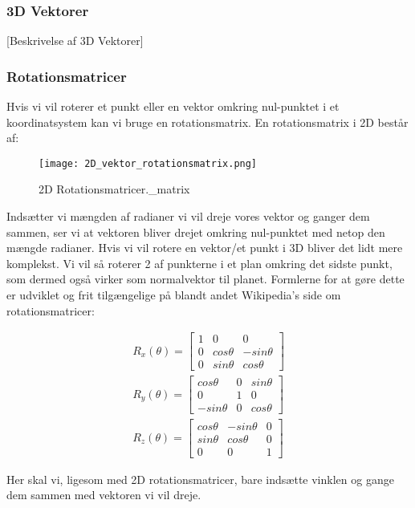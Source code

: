 \subsubsection{3D Vektorer}

[Beskrivelse af 3D Vektorer]


\subsubsection{Rotationsmatricer}
Hvis vi vil roterer et punkt eller en vektor omkring nul-punktet i et koordinatsystem kan vi bruge en rotationsmatrix\cite{rotationsmatricer}. En rotationsmatrix i 2D består af:
\begin{figure}[H]
  \centering
  \texttt{[image: 2D\_vektor\_rotationsmatrix.png]}
  \caption{2D Rotationsmatricer.\_matrix}
\end{figure}



Indsætter vi mængden af radianer vi vil dreje vores vektor og ganger dem sammen, ser vi at vektoren bliver drejet omkring nul-punktet med netop den mængde radianer. 
Hvis vi vil rotere en vektor/et punkt i 3D bliver det lidt mere komplekst. Vi vil så roterer 2 af punkterne i et plan omkring det sidste punkt, som dermed også virker som normalvektor til planet. Formlerne for at gøre dette er udviklet og frit tilgængelige på blandt andet Wikipedia's side om rotationsmatricer:

\begin{align}\label{eu_eqn}
R_x(\theta) = 
\begin{bmatrix}
1 & 0 & 0\\ 
0 & cos \theta & - sin \theta\\ 
0 & sin \theta & cos \theta
\end{bmatrix}\\
R_y(\theta) = 
\begin{bmatrix}
cos \theta  & 0 & sin \theta\\ 
0           & 1 & 0\\ 
-sin \theta & 0 & cos \theta
\end{bmatrix}\\
R_z(\theta) = 
\begin{bmatrix}
cos \theta & - sin \theta & 0\\ 
sin \theta & cos \theta & 0\\
0 & 0 & 1
\end{bmatrix}
\end{align}

Her skal vi, ligesom med 2D rotationsmatricer, bare indsætte vinklen og gange dem sammen med vektoren vi vil dreje.